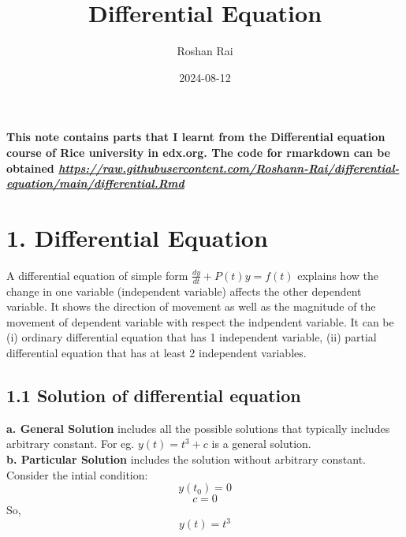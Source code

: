 \documentclass[
  11pt,
]{article}
\title{Differential Equation}
\author{Roshan Rai}
\date{2024-08-12}
\begin{document}
\maketitle

\onehalfspacing

\textbf{This note contains parts that I learnt from the Differential
equation course of Rice university in edx.org. The code for rmarkdown
can be obtained
\href{https://raw.githubusercontent.com/Roshann-Rai/differential-equation/main/differential.Rmd}{\emph{https://raw.githubusercontent.com/Roshann-Rai/differential-equation/main/differential.Rmd}}}

\section{1. Differential Equation}\label{differential-equation}

A differential equation of simple form \(\frac{dy}{dt} + P(t)y = f(t)\)
explains how the change in one variable (independent variable) affects
the other dependent variable. It shows the direction of movement as well
as the magnitude of the movement of dependent variable with respect the
indpendent variable. It can be (i) ordinary differential equation that
has 1 independent variable, (ii) partial differential equation that has
at least 2 independent variables.

\subsection{1.1 Solution of differential
equation}\label{solution-of-differential-equation}

\textbf{a. General Solution} includes all the possible solutions that
typically includes arbitrary constant. For eg. \(y(t) = t^3 + c\) is a
general solution.\\
\textbf{b. Particular Solution} includes the solution without arbitrary
constant. Consider the intial condition: \[y(t_0) = 0\] \[c = 0\] So,
\[y(t) = t^3\] \clearpage
\end{document}
